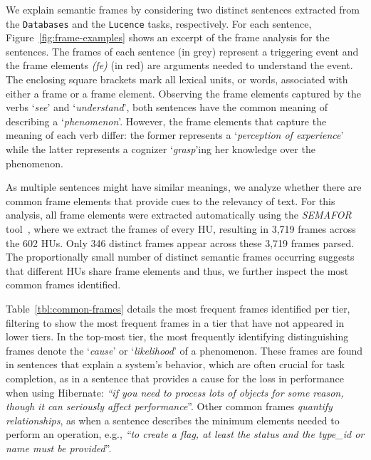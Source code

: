 We explain semantic frames by considering
 two distinct sentences extracted 
from the \texttt{Databases} and the \texttt{Lucence} tasks, respectively.
For each sentence, Figure~\ref{fig:frame-examples} shows an
excerpt of the frame analysis for the sentences. 
The frames of each sentence (in grey) represent a triggering event and the frame elements \textit{(fe)} (in red) are arguments needed to understand the event. The enclosing square brackets mark all lexical units, or words, associated with either a frame or a frame element.
Observing the frame elements captured by the verbs `\textit{see}' and
`\textit{understand}', both sentences have the common meaning of
describing a `\textit{phenomenon}'.
However, the frame elements
that capture the meaning of each verb differ: the former represents a
`\textit{perception of experience}' while the latter represents a
cognizer `\textit{grasp}'ing her knowledge over the 
phenomenon. 



As multiple sentences might have similar meanings,
we analyze whether there are common frame elements 
that provide cues to the relevancy of text.
For this analysis, all frame elements were extracted automatically
using the \textit{SEMAFOR} tool~\cite{das2014frame},
where we extract the frames of every HU, resulting in 3,719 frames across
the 602 HUs. Only 346 distinct frames appear across these 3,719 frames
parsed. The proportionally small number of distinct semantic frames
occurring suggests that different HUs share frame elements
and thus, we further inspect the most common frames identified.



Table~\ref{tbl:common-frames} details the most frequent frames identified per tier, filtering to show the 
most frequent frames in a tier that have not appeared in lower tiers.
In the top-most tier, the most frequently identifying distinguishing
frames denote the `\textit{cause}' or `\textit{likelihood}' of a phenomenon.
These frames are found in sentences that explain a system's behavior, which are often crucial for task completion,
as in a sentence that provides a cause for the loss in performance when using Hibernate:
 \textit{``if you need to process lots of objects for some reason, though it can seriously affect performance}''.
Other common frames \textit{quantify relationships},
as when a sentence describes the minimum elements needed to perform an operation, e.g., \textit{``to create a flag, at least the status and the type\_id or name must be provided}''.


